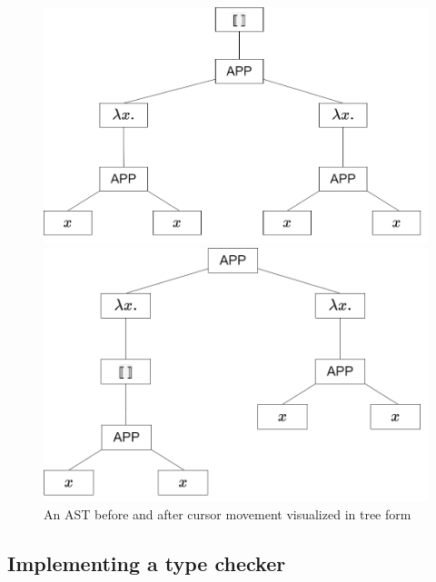 \begin{figure}
  \center
  \noindent\begin{minipage}{.45\textwidth}
    \center
    \includegraphics[width=\textwidth]{assets/ast_root_cursor.png}
  \end{minipage}\hfill
  \begin{minipage}{.45\textwidth}
    \center
    \includegraphics[width=\textwidth]{assets/ast_subtree_cursor.png}
  \end{minipage}\hfill
  \caption{An AST before and after cursor movement visualized in tree form}
  \label{fig:ast_visual_tree}
\end{figure}

\subsection{Implementing a type checker}

